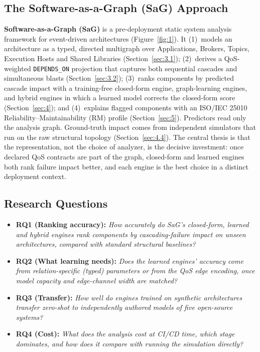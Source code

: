 \documentclass[preprint,3p]{elsarticle}
\providecommand{\tightlist}{%
  \setlength{\itemsep}{0pt}\setlength{\parskip}{0pt}}
\begin{document}
\subsection{The Software-as-a-Graph (SaG) Approach}
\label{sec:1.3}

\textbf{Software-as-a-Graph (SaG)} is a pre-deployment static system analysis framework for event-driven architectures (Figure~\ref{fig:1}). It (1)~models an architecture as a typed, directed multigraph over Applications, Brokers, Topics, Execution Hosts and Shared Libraries (Section~\ref{sec:3.1}); (2)~derives a QoS-weighted \texttt{DEPENDS\_ON} projection that captures both sequential cascades and simultaneous blasts (Section~\ref{sec:3.2}); (3)~ranks components by predicted cascade impact with a training-free closed-form engine, graph-learning engines, and hybrid engines in which a learned model corrects the closed-form score (Section~\ref{sec:4}); and (4)~explains flagged components with an ISO/IEC 25010 Reliability--Maintainability (RM) profile (Section~\ref{sec:5}). Predictors read only the analysis graph. Ground-truth impact comes from independent simulators that run on the raw structural topology (Section~\ref{sec:4.4}). The central thesis is that the representation, not the choice of analyzer, is the decisive investment: once declared QoS contracts are part of the graph, closed-form and learned engines both rank failure impact better, and each engine is the best choice in a distinct deployment context.

\subsection{Research Questions}
\label{sec:1.4}

\begin{itemize}\tightlist
\item \textbf{RQ1 (Ranking accuracy):} \emph{How accurately do SaG's closed-form, learned and hybrid engines rank components by cascading-failure impact on unseen architectures, compared with standard structural baselines?}
\item \textbf{RQ2 (What learning needs):} \emph{Does the learned engines' accuracy come from relation-specific (typed) parameters or from the QoS edge encoding, once model capacity and edge-channel width are matched?}
\item \textbf{RQ3 (Transfer):} \emph{How well do engines trained on synthetic architectures transfer zero-shot to independently authored models of five open-source systems?}
\item \textbf{RQ4 (Cost):} \emph{What does the analysis cost at CI/CD time, which stage dominates, and how does it compare with running the simulation directly?}
\end{itemize}
\end{document}
